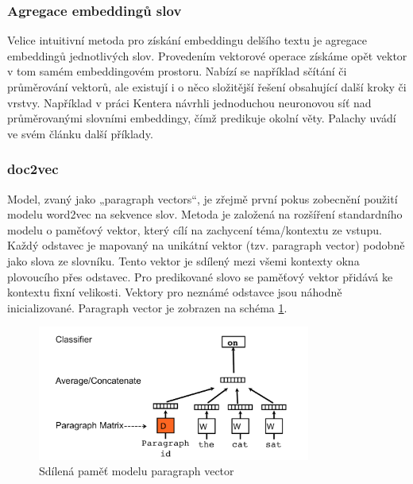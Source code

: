 \documentclass[thesis=M,czech]{FITthesis}[2019/12/23]
\begin{document}
\subsubsection*{Agregace embeddingů slov}
Velice intuitivní metoda pro získání embeddingu delšího textu je agregace embeddingů jednotlivých slov. Provedením vektorové operace získáme opět vektor v tom samém embeddingovém prostoru. Nabízí se například sčítání či průměrování vektorů,  ale existují i o něco složitější řešení obsahující další kroky či vrstvy. Například v práci Kentera\cite{kenter2016} návrhli jednoduchou neuronovou síť nad průměrovanými slovními embeddingy, čímž predikuje okolní věty. Palachy uvádí ve svém článku\cite{palachy2019} další příklady.

\subsubsection*{doc2vec}
Model, zvaný jako „paragraph vectors“\cite{le2014}, je zřejmě první pokus zobecnění použití modelu word2vec na sekvence slov. Metoda je založená na rozšíření standardního modelu o paměťový vektor, který cílí na zachycení téma/kontextu ze vstupu. Každý odstavec je mapovaný na unikátní vektor (tzv. paragraph vector) podobně jako slova ze slovníku. Tento vektor je sdílený mezi všemi kontexty okna plovoucího přes odstavec. Pro predikované slovo se paměťový vektor přidává ke kontextu fixní velikosti. Vektory pro neznámé odstavce jsou náhodně inicializované. Paragraph vector je zobrazen na schéma \ref{fig:palachy2019PV}.
\begin{figure}\centering
	\includegraphics[width=0.8\textwidth]{images/palachy2019/palachy2019_PV.png}
	\caption{Sdílená paměť modelu paragraph vector\cite{palachy2019}}\label{fig:palachy2019PV}
\end{figure}
\end{document}
